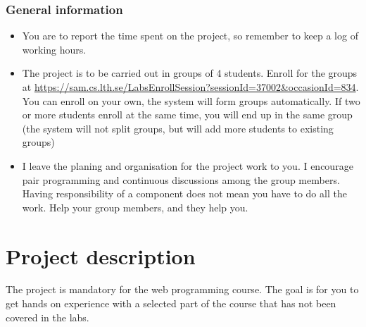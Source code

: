 \documentclass[fleqn, article, a4paper]{memoir}
\begin{document}
\maketitle
\thispagestyle{titlepage}
\vspace{-4cm}

\subsubsection*{General information}

\begin{itemize}\firmlist
\item You are to report the time spent on the project, so remember to keep a log of working hours.
\item The project is to be carried out in groups of 4 students. Enroll for the groups at \url{https://sam.cs.lth.se/LabsEnrollSession?sessionId=37002&occasionId=834}. You can enroll on your own, the system will form groups automatically. If two or more students  enroll at the same time, you will end up in the same group (the system will not split groups, but will add more students to existing groups)
\item I leave the planing and organisation for the project work to you. I encourage pair programming and continuous discussions among the group members. Having responsibility of a component does not mean you have to do all the work. Help your group members, and they help you.
\end{itemize}

\section*{Project description}
\n The project is mandatory for the web programming course. The goal is for you to get hands on experience with a selected part of the course that has not been covered in the labs.
\end{document}
